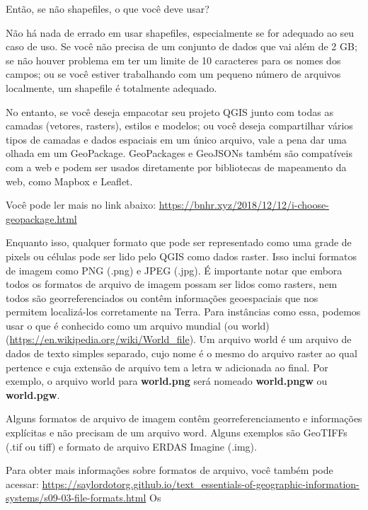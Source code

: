 \documentclass[
  portuguese,
]{krantz}
\begin{document}
Então, se não shapefiles, o que você deve usar?

Não há nada de errado em usar shapefiles, especialmente se for adequado ao seu caso de uso. Se você não precisa de um conjunto de dados que vai além de 2 GB; se não houver problema em ter um limite de 10 caracteres para os nomes dos campos; ou se você estiver trabalhando com um pequeno número de arquivos localmente, um shapefile é totalmente adequado.

No entanto, se você deseja empacotar seu projeto QGIS junto com todas as camadas (vetores, rasters), estilos e modelos; ou você deseja compartilhar vários tipos de camadas e dados espaciais em um único arquivo, vale a pena dar uma olhada em um GeoPackage. GeoPackages e GeoJSONs também são compatíveis com a web e podem ser usados diretamente por bibliotecas de mapeamento da web, como Mapbox e Leaflet.

Você pode ler mais no link abaixo: \href{https://bnhr.xyz/2018/12/12/i-choose\%20-geopackage.html}{https://bnhr.xyz/2018/12/12/i-choose-geopackage.html}

Enquanto isso, qualquer formato que pode ser representado como uma grade de pixels ou células pode ser lido pelo QGIS como dados raster. Isso inclui formatos de imagem como PNG (.png) e JPEG (.jpg). É importante notar que embora todos os formatos de arquivo de imagem possam ser lidos como rasters, nem todos são georreferenciados ou contêm informações geoespaciais que nos permitem localizá-los corretamente na Terra. Para instâncias como essa, podemos usar o que é conhecido como um arquivo mundial (ou world) (\url{https://en.wikipedia.org/wiki/World_file}). Um arquivo world é um arquivo de dados de texto simples separado, cujo nome é o mesmo do arquivo raster ao qual pertence e cuja extensão de arquivo tem a letra w adicionada ao final. Por exemplo, o arquivo world para \textbf{world.png} será nomeado \textbf{world.pngw} ou \textbf{world.pgw}.

Alguns formatos de arquivo de imagem contêm georreferenciamento e informações explícitas e não precisam de um arquivo word. Alguns exemplos são GeoTIFFs (.tif ou tiff) e formato de arquivo ERDAS Imagine (.img).

Para obter mais informações sobre formatos de arquivo, você também pode acessar: \href{https://saylordotorg.\%20github.io/text_essentials-of-geographic-information-systems/s09-03-file-formats.html}{https://saylordotorg.github.io/text\_essentials-of-geographic-information-systems/s09-03-file-formats.html} Os
\end{document}
